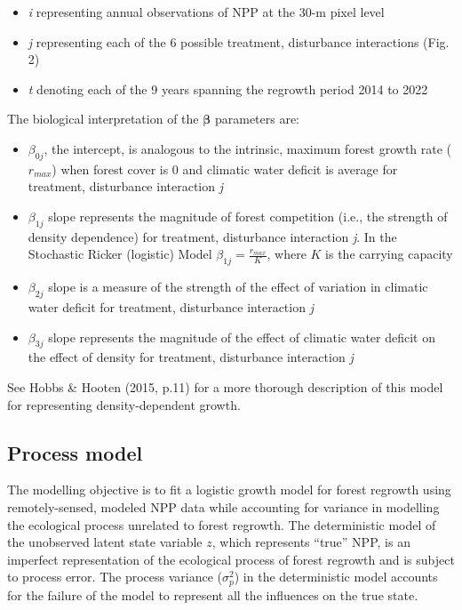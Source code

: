 \documentclass[
]{article}
\providecommand{\tightlist}{%
  \setlength{\itemsep}{0pt}\setlength{\parskip}{0pt}}
\begin{document}
\begin{itemize}
\tightlist
\item
  \emph{i} representing annual observations of NPP at the 30-m pixel
  level
\item
  \emph{j} representing each of the 6 possible treatment, disturbance
  interactions (Fig. 2)
\item
  \emph{t} denoting each of the 9 years spanning the regrowth period
  2014 to 2022
\end{itemize}

The biological interpretation of the \(\boldsymbol{\beta}\) parameters
are:

\begin{itemize}
\item
  \(\beta_{0j}\), the intercept, is analogous to the intrinsic, maximum
  forest growth rate (\(r_{max}\)) when forest cover is 0 and climatic
  water deficit is average for treatment, disturbance interaction
  \emph{j}
\item
  \(\beta_{1j}\) slope represents the magnitude of forest competition
  (i.e., the strength of density dependence) for treatment, disturbance
  interaction \emph{j}. In the Stochastic Ricker (logistic) Model
  \(\beta_{1j} = \frac{r_{max}}{K}\), where \(K\) is the carrying
  capacity
\item
  \(\beta_{2j}\) slope is a measure of the strength of the effect of
  variation in climatic water deficit for treatment, disturbance
  interaction \emph{j}
\item
  \(\beta_{3j}\) slope represents the magnitude of the effect of
  climatic water deficit on the effect of density for treatment,
  disturbance interaction \emph{j}
\end{itemize}

See Hobbs \& Hooten (2015, p.11) for a more thorough description of this
model for representing density-dependent growth.

\hypertarget{process-model}{%
\subsection{Process model}\label{process-model}}

The modelling objective is to fit a logistic growth model for forest
regrowth using remotely-sensed, modeled NPP data while accounting for
variance in modelling the ecological process unrelated to forest
regrowth. The deterministic model of the unobserved latent state
variable \(z\), which represents ``true'' NPP, is an imperfect
representation of the ecological process of forest regrowth and is
subject to process error. The process variance (\(\sigma^{2}_{p}\)) in
the deterministic model accounts for the failure of the model to
represent all the influences on the true state.
\end{document}
